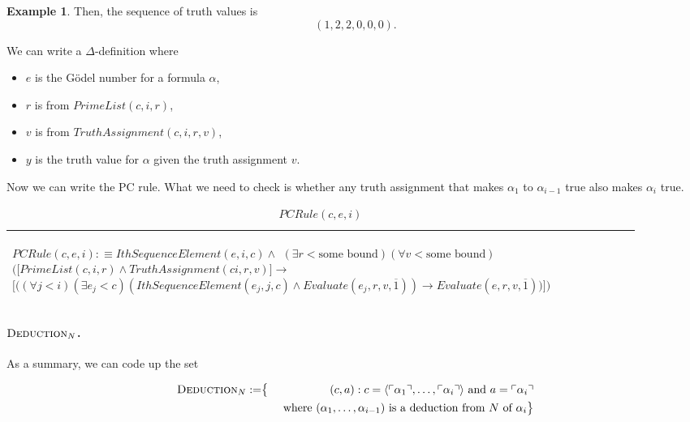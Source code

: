 \documentclass[11pt,letterpaper]{book}
\theoremstyle{definition}
\newtheorem{example}{Example}[section]
\begin{document}
\begin{enumerate}
\begin{example}
Then, the sequence of truth values is
$$ (1, 2, 2, 0, 0, 0) .$$

\end{example}

We can write a $\Delta$-definition  where 
\begin{itemize}
\item{$e$ is the G\"odel number for a formula $\alpha$,}
\item{$r$ is from $PrimeList(c, i, r)$,}
\item{$v$ is from $TruthAssignment(c, i, r, v)$,}
\item{$y$ is the truth value for $\alpha$ given the truth assignment $v$.}
\end{itemize}

Now we can write the PC rule. What we need to check is whether any truth assignment that makes $\alpha_1$ to $\alpha_{i-1}$ true also makes $\alpha_i$ true.

\begin{table}[ht!]
\caption{$PCRule(c, e, i)$}
\label{box:PC_rule}
\begin{tabular}{|p{0.9\linewidth}|}
\hline
\rule{0pt}{3ex}
\begin{center}
$PCRule(c, e, i) : \equiv  IthSequenceElement(e, i, c) \land $
$ (\exists r < \text{some bound}) (\forall v < \text{some bound}) $
$ \bigg( \big[ PrimeList(c, i, r) \land TruthAssignment(c i, r, v) \big] \rightarrow $
$ \big[ \big( (\forall j < i) (\exists e_j < c) (IthSequenceElement(e_j, j, c) \land Evaluate(e_j, r, v, \overline{1}) ) \rightarrow Evaluate(e, r, v, \overline{1})  \big)  \big]  \bigg) $
\end{center}\\
\hline
\end{tabular}
\end{table}


\end{enumerate}

\paragraph{$\text{\textsc{Deduction}}_N$.}


As a summary, we can code up the set 

\begin{eqnarray*}
\text{\textsc{Deduction}}_N := & \big\{& (c, a) : c = \langle \ulcorner \alpha_1 \urcorner , \ldots, \ulcorner \alpha_i \urcorner \rangle \text{ and } a = \ulcorner \alpha_i \urcorner \\
& & \text{ where } (\alpha_1, \ldots, \alpha_{i-1}) \text{ is a deduction from $N$ of $\alpha_i$}  \big\} 
\end{eqnarray*}
\end{document}
